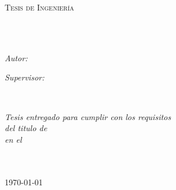 \documentclass[
11pt, %
spanish, %
singlespacing, %
headsepline, %
]{MastersDoctoralThesis} %
\author{Nicholas \textsc{Spalding Earley-Dolenc}} %
\begin{document}
\frontmatter %

\pagestyle{plain} %


\begin{titlepage}
\begin{center}

\vspace*{.06\textheight}
{\scshape\LARGE \univname\par}\vspace{1.5cm} %
\textsc{\Large Tesis de Ingeniería}\\[0.5cm] %

\HRule \\[0.4cm] %
{\huge \bfseries \ttitle\par}\vspace{0.4cm} %
\HRule \\[1.5cm] %

\begin{minipage}[t]{0.4\textwidth}
\begin{flushleft} \large
\emph{Autor:}\\
\href{https://github.com/nishedcob}{\authorname} %
\end{flushleft}
\end{minipage}
\begin{minipage}[t]{0.4\textwidth}
\begin{flushright} \large
\emph{Supervisor:} \\
\href{https://github.com/nishedcob}{\supname} %
\end{flushright}
\end{minipage}\\[3cm]

\vfill

\large \textit{Tesis entregado para cumplir con los requisitos\\ del titulo de \degreename}\\[0.3cm] %
\textit{en el}\\[0.4cm]
\groupname\\\deptname\\[2cm] %

\vfill

{\large \today}\\[4cm] %

\vfill
\end{center}
\end{titlepage}
\end{document}
